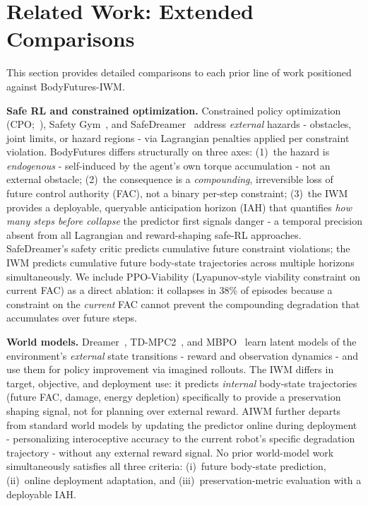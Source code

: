 \documentclass{article}
\begin{document}
{\section{Related Work: Extended Comparisons}
\label{app:relatedwork}

This section provides detailed comparisons to each prior line of work positioned against BodyFutures-IWM.

\textbf{Safe RL and constrained optimization.}
Constrained policy optimization (CPO;~\citealt{achiam2017constrained}), Safety Gym~\citep{ray2019safetygym}, and SafeDreamer~\citep{huang2024safedreamer} address \emph{external} hazards - obstacles, joint limits, or hazard regions - via Lagrangian penalties applied per constraint violation. BodyFutures differs structurally on three axes: (1)~the hazard is \emph{endogenous} - self-induced by the agent's own torque accumulation - not an external obstacle; (2)~the consequence is a \emph{compounding}, irreversible loss of future control authority (FAC), not a binary per-step constraint; (3)~the IWM provides a deployable, queryable anticipation horizon (IAH) that quantifies \emph{how many steps before collapse} the predictor first signals danger - a temporal precision absent from all Lagrangian and reward-shaping safe-RL approaches. SafeDreamer's safety critic predicts cumulative future constraint violations; the IWM predicts cumulative future body-state trajectories across multiple horizons simultaneously. We include PPO-Viability (Lyapunov-style viability constraint on current FAC) as a direct ablation: it collapses in 38\% of episodes because a constraint on the \emph{current} FAC cannot prevent the compounding degradation that accumulates over future steps.

\textbf{World models.}
Dreamer~\citep{hafner2020dreamer,hafner2023dreamerv3}, TD-MPC2~\citep{hansen2023tdmpc2}, and MBPO~\citep{janner2019mbpo} learn latent models of the environment's \emph{external} state transitions - reward and observation dynamics - and use them for policy improvement via imagined rollouts. The IWM differs in target, objective, and deployment use: it predicts \emph{internal} body-state trajectories (future FAC, damage, energy depletion) specifically to provide a preservation shaping signal, not for planning over external reward. AIWM further departs from standard world models by updating the predictor online during deployment - personalizing interoceptive accuracy to the current robot's specific degradation trajectory - without any external reward signal. No prior world-model work simultaneously satisfies all three criteria: (i)~future body-state prediction, (ii)~online deployment adaptation, and (iii)~preservation-metric evaluation with a deployable IAH.

}
\end{document}
